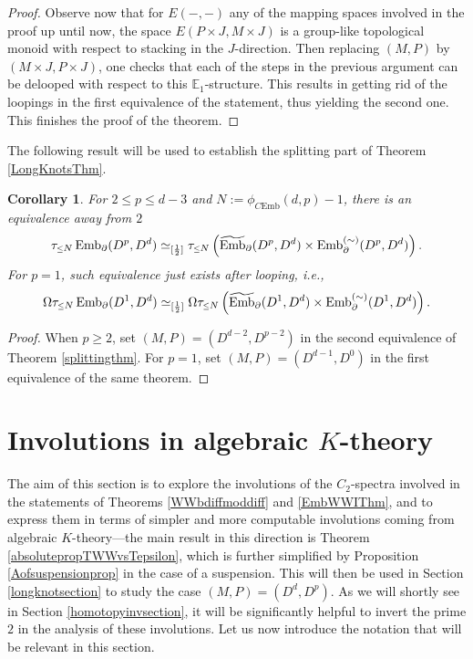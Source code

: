 \documentclass[a4paper, oneside]{amsart}
\newcommand{\emb}{\operatorname{Emb}}
\newcommand{\bemb}{\widetilde{\operatorname{Emb}}}
\newcommand{\cemb}{C\mathrm{Emb}}
\newcommand{\1}{\mathds{1}}
\newtheorem{cor}[thm]{Corollary}
\theoremstyle{remark}
\theoremstyle{definition}
\newcommand{\leqs}{\scaleobj{0.85}{\leq}}
\newcommand{\pemb}{\operatorname{Emb}^{(\sim)}}
\numberwithin{equation}{section}
\begin{document}
\begin{proof}
Observe now that for $E(-,-)$ any of the mapping spaces involved in the proof up until now, the space $E(P\times J,M\times J)$ is a group-like topological monoid with respect to stacking in the $J$-direction. Then replacing $(M,P)$ by $(M\times J, P\times J)$, one checks that each of the steps in the previous argument can be delooped with respect to this $\mathbb{E}_1$-structure. This results in getting rid of the loopings in the first equivalence of the statement, thus yielding the second one. This finishes the proof of the theorem.
\end{proof}


The following result will be used to establish the splitting part of Theorem \ref{LongKnotsThm}.

\begin{cor}\label{splittinglongknotcor}
    For $2\leq p\leq d-3$ and $N:=\phi_{\cemb}(d,p)-1$, there is an equivalence away from $2$
$$
\tau_{\leqs N} \emb_{\partial}(D^p, D^d)\simeq_{[\frac{1}{2}]}\tau_{\leqs N}\left(\bemb_{\partial}(D^p,D^d)\times \pemb_{\partial}(D^p,D^d)\right).
$$
For $p=1$, such equivalence just exists after looping, i.e., 
$$
\Omega\tau_{\leqs N} \emb_{\partial}(D^1, D^d)\simeq_{[\frac{1}{2}]}\Omega\tau_{\leqs N}\left(\bemb_{\partial}(D^1,D^d)\times \pemb_{\partial}(D^1,D^d)\right).
$$
\end{cor}
\begin{proof}
    When $p\geq2$, set $(M,P)=(D^{d-2}, D^{p-2})$ in the second equivalence of Theorem \ref{splittingthm}. For $p=1$, set $(M,P)=(D^{d-1},D^0)$ in the first equivalence of the same theorem.
\end{proof}




























\section{Involutions in algebraic $K$-theory}\label{pseudoisotopyknotsection} 

The aim of this section is to explore the involutions of the $C_2$-spectra involved in the statements of Theorems \ref{WWbdiffmoddiff} and \ref{EmbWWIThm}, and to express them in terms of simpler and more computable involutions coming from algebraic $K$-theory---the main result in this direction is Theorem \ref{absolutepropTWWvsTepsilon}, which is further simplified by Proposition \ref{Aofsuspensionprop} in the case of a suspension. This will then be used in Section \ref{longknotsection} to study the case $(M,P)=(D^d,D^p)$. As we will shortly see in Section \ref{homotopyinvsection}, it will be significantly helpful to invert the prime $2$ in the analysis of these involutions. Let us now introduce the notation that will be relevant in this section.
\end{document}
